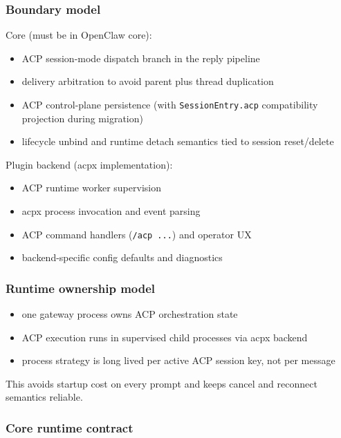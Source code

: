 \subsubsection{Boundary model}


Core (must be in OpenClaw core):

\begin{itemize}
  \item ACP session-mode dispatch branch in the reply pipeline
  \item delivery arbitration to avoid parent plus thread duplication
  \item ACP control-plane persistence (with \texttt{SessionEntry.acp} compatibility projection during migration)
  \item lifecycle unbind and runtime detach semantics tied to session reset/delete
\end{itemize}


Plugin backend (acpx implementation):

\begin{itemize}
  \item ACP runtime worker supervision
  \item acpx process invocation and event parsing
  \item ACP command handlers (\texttt{/acp ...}) and operator UX
  \item backend-specific config defaults and diagnostics
\end{itemize}


\subsubsection{Runtime ownership model}


\begin{itemize}
  \item one gateway process owns ACP orchestration state
  \item ACP execution runs in supervised child processes via acpx backend
  \item process strategy is long lived per active ACP session key, not per message
\end{itemize}


This avoids startup cost on every prompt and keeps cancel and reconnect semantics reliable.

\subsubsection{Core runtime contract}


